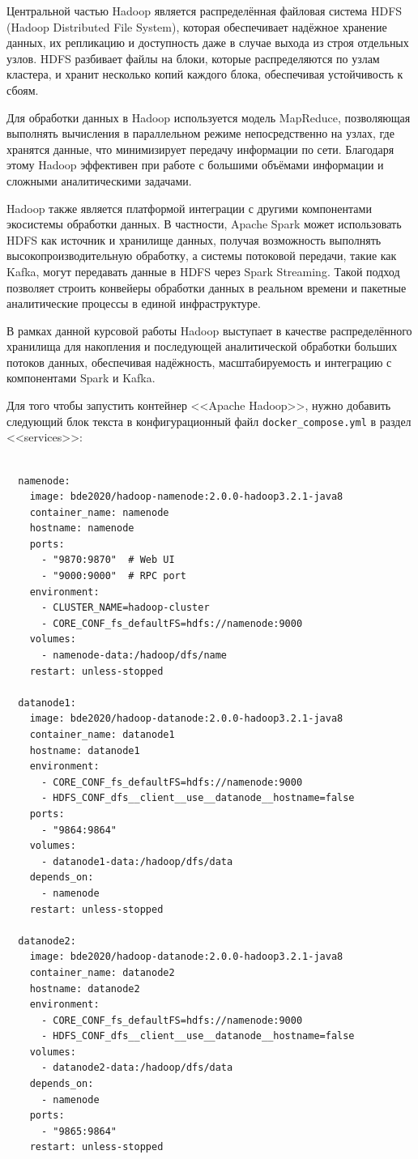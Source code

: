 \documentclass[14pt,a4paper]{extarticle}
\begin{document}
Центральной частью Hadoop является распределённая файловая система HDFS (Hadoop
Distributed File System), которая обеспечивает надёжное хранение данных, их
репликацию и доступность даже в случае выхода из строя отдельных узлов. HDFS
разбивает файлы на блоки, которые распределяются по узлам кластера, и хранит
несколько копий каждого блока, обеспечивая устойчивость к сбоям.

Для обработки данных в Hadoop используется модель MapReduce, позволяющая
выполнять вычисления в параллельном режиме непосредственно на узлах, где
хранятся данные, что минимизирует передачу информации по сети. Благодаря этому
Hadoop эффективен при работе с большими объёмами информации и сложными
аналитическими задачами.

Hadoop также является платформой интеграции с другими компонентами экосистемы
обработки данных. В частности, Apache Spark может использовать HDFS как
источник и хранилище данных, получая возможность выполнять
высокопроизводительную обработку, а системы потоковой передачи, такие как
Kafka, могут передавать данные в HDFS через Spark Streaming. Такой подход
позволяет строить конвейеры обработки данных в реальном времени и пакетные
аналитические процессы в единой инфраструктуре.

В рамках данной курсовой работы Hadoop выступает в качестве распределённого
хранилища для накопления и последующей аналитической обработки больших потоков
данных, обеспечивая надёжность, масштабируемость и интеграцию с компонентами
Spark и Kafka.


Для того чтобы запустить контейнер <<Apache Hadoop>>, нужно добавить
следующий блок текста в конфигурационный файл \texttt{docker\_compose.yml} в
раздел <<services>>:

\begin{verbatim}

  namenode:
    image: bde2020/hadoop-namenode:2.0.0-hadoop3.2.1-java8
    container_name: namenode
    hostname: namenode
    ports:
      - "9870:9870"  # Web UI
      - "9000:9000"  # RPC port
    environment:
      - CLUSTER_NAME=hadoop-cluster
      - CORE_CONF_fs_defaultFS=hdfs://namenode:9000
    volumes:
      - namenode-data:/hadoop/dfs/name
    restart: unless-stopped

  datanode1:
    image: bde2020/hadoop-datanode:2.0.0-hadoop3.2.1-java8
    container_name: datanode1
    hostname: datanode1
    environment:
      - CORE_CONF_fs_defaultFS=hdfs://namenode:9000
      - HDFS_CONF_dfs__client__use__datanode__hostname=false
    ports:
      - "9864:9864"
    volumes:
      - datanode1-data:/hadoop/dfs/data
    depends_on:
      - namenode
    restart: unless-stopped

  datanode2:
    image: bde2020/hadoop-datanode:2.0.0-hadoop3.2.1-java8
    container_name: datanode2
    hostname: datanode2
    environment:
      - CORE_CONF_fs_defaultFS=hdfs://namenode:9000
      - HDFS_CONF_dfs__client__use__datanode__hostname=false
    volumes:
      - datanode2-data:/hadoop/dfs/data
    depends_on:
      - namenode
    ports:
      - "9865:9864"
    restart: unless-stopped

\end{verbatim}
\end{document}
